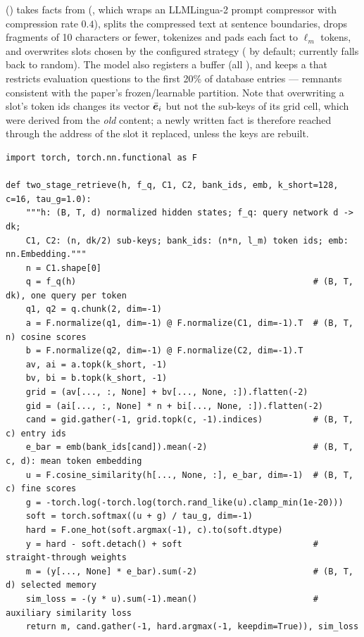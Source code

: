 \begin{implnote}[title={In the code: updating the bank at inference}]
 ()
takes facts from  (,
which wraps an LLMLingua-2 prompt compressor with compression rate $0.4$), splits the compressed
text at sentence boundaries, drops fragments of 10 characters or fewer, tokenizes and pads each
fact to $\ell_m$ tokens, and overwrites slots chosen by the configured strategy ( by
default;  currently falls back to random). The model also registers a
 buffer (all ), and
 keeps a
 that restricts evaluation questions to the first 20\% of database
entries --- remnants consistent with the paper's frozen/learnable partition. Note that overwriting
a slot's token ids changes its vector $\bar{\bm{e}}_i$ but not the sub-keys of its grid cell, which
were derived from the \emph{old} content; a newly written fact is therefore reached through the
address of the slot it replaced, unless the keys are rebuilt.
\end{implnote}

\begin{lstlisting}[caption={Reference implementation (ours): two-stage retrieval with product keys and a straight-through Gumbel-Softmax (per-token queries).},label={lst:c10-explicit-ref}]
import torch, torch.nn.functional as F

def two_stage_retrieve(h, f_q, C1, C2, bank_ids, emb, k_short=128, c=16, tau_g=1.0):
    """h: (B, T, d) normalized hidden states; f_q: query network d -> dk;
    C1, C2: (n, dk/2) sub-keys; bank_ids: (n*n, l_m) token ids; emb: nn.Embedding."""
    n = C1.shape[0]
    q = f_q(h)                                               # (B, T, dk), one query per token
    q1, q2 = q.chunk(2, dim=-1)
    a = F.normalize(q1, dim=-1) @ F.normalize(C1, dim=-1).T  # (B, T, n) cosine scores
    b = F.normalize(q2, dim=-1) @ F.normalize(C2, dim=-1).T
    av, ai = a.topk(k_short, -1)
    bv, bi = b.topk(k_short, -1)
    grid = (av[..., :, None] + bv[..., None, :]).flatten(-2)
    gid = (ai[..., :, None] * n + bi[..., None, :]).flatten(-2)
    cand = gid.gather(-1, grid.topk(c, -1).indices)          # (B, T, c) entry ids
    e_bar = emb(bank_ids[cand]).mean(-2)                     # (B, T, c, d): mean token embedding
    u = F.cosine_similarity(h[..., None, :], e_bar, dim=-1)  # (B, T, c) fine scores
    g = -torch.log(-torch.log(torch.rand_like(u).clamp_min(1e-20)))
    soft = torch.softmax((u + g) / tau_g, dim=-1)
    hard = F.one_hot(soft.argmax(-1), c).to(soft.dtype)
    y = hard - soft.detach() + soft                          # straight-through weights
    m = (y[..., None] * e_bar).sum(-2)                       # (B, T, d) selected memory
    sim_loss = -(y * u).sum(-1).mean()                       # auxiliary similarity loss
    return m, cand.gather(-1, hard.argmax(-1, keepdim=True)), sim_loss
\end{lstlisting}

